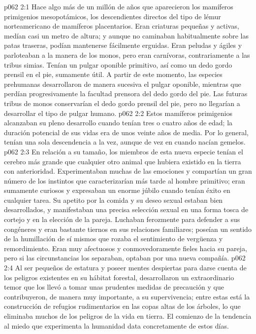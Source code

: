 \vs p062 2:1 Hace algo más de un millón de años que aparecieron  los mamíferos primigenios mesopotámicos, los descendientes directos del tipo de lémur norteamericano de mamíferos placentarios. Eran criaturas pequeñas y activas, medían casi un metro de altura; y aunque no caminaban habitualmente sobre las patas traseras, podían mantenerse fácilmente erguidas. Eran peludas y ágiles y parloteaban a la manera de los monos, pero eran carnívoras, contrariamente a las tribus simias. Tenían un pulgar oponible primitivo, así como un dedo gordo prensil en el pie, sumamente útil. A partir de este momento, las especies prehumanas desarrollaron de manera sucesiva el pulgar oponible, mientras que perdían progresivamente la facultad prensora del dedo gordo del pie. Las futuras tribus de monos conservarían el dedo gordo prensil del pie, pero no llegarían a desarrollar el tipo de pulgar humano.
\vs p062 2:2 Estos mamíferos primigenios alcanzaban su pleno desarrollo cuando tenían tres o cuatro años de edad; la duración potencial de sus vidas era de unos veinte años de media. Por lo general, tenían una sola descendencia a la vez, aunque de vez en cuando nacían gemelos.
\vs p062 2:3 En relación a su tamaño, los miembros de esta nueva especie tenían el cerebro más grande que cualquier otro animal que hubiera existido en la tierra con anterioridad. Experimentaban muchas de las emociones y compartían un gran número de los instintos que caracterizarían más tarde al hombre primitivo; eran sumamente curiosos y expresaban un enorme júbilo cuando tenían éxito en cualquier tarea. Su apetito por la comida y su deseo sexual estaban bien desarrollados, y manifestaban una precisa selección sexual en una forma tosca de cortejo y en la elección de la pareja. Luchaban ferozmente para defender a sus congéneres y eran bastante tiernos en sus relaciones familiares; poseían un sentido de la humillación de sí mismos que rozaba el sentimiento de vergüenza y remordimiento. Eran muy afectuosos y conmovedoramente fieles hacia su pareja, pero si las circunstancias los separaban, optaban por una nueva compañía.
\vs p062 2:4 Al ser pequeños de estatura y poseer mentes despiertas para darse cuenta de los peligros existentes en su hábitat forestal, desarrollaron un extraordinario temor que los llevó a tomar unas prudentes medidas de precaución y que contribuyeron, de manera muy importante, a su supervivencia; entre estas está la construcción de refugios rudimentarios en las copas altas de los árboles, lo que eliminaba muchos de los peligros de la vida en tierra. El comienzo de la tendencia al miedo que experimenta la humanidad data concretamente de estos días.
